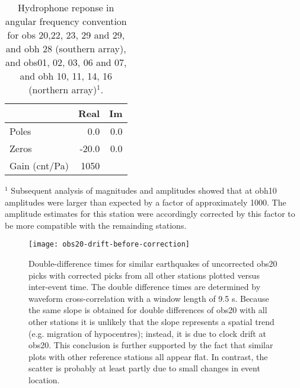 \documentclass[reviewcopy]{elsarticle}
\renewcommand{\includegraphics}[2][]{\fbox{#2}}
\begin{document}
\begin{table}
\caption{Hydrophone reponse in angular frequency convention for obs
  20,22, 23, 29 and 29, and obh 28 (southern array), and obs01, 02,
  03, 06 and 07, and obh 10, 11, 14, 16 (northern array)$^1$. }
\label{tbl:hyd-response}
\renewcommand{\baselinestretch}{1.0}
\small
\begin{center}
\begin{tabular}{lrr}
\hline
 & Real  & Im \\
\hline
Poles & 0.0   & 0.0 \\
Zeros & -20.0 & 0.0 \\
Gain (cnt/Pa) & 1050 & \\
\hline
\end{tabular}
\end{center}
\footnotesize
$^1$ Subsequent analysis of magnitudes and amplitudes showed that at obh10 amplitudes
were larger than expected by a factor of approximately 1000.  The
amplitude estimates for this station were accordingly corrected by
this factor to be more compatible with the remainding stations.
\end{table}


\begin{figure}
\centering
\texttt{[image: obs20-drift-before-correction]}
\caption{Double-difference times for similar earthquakes of uncorrected obs20 picks
with corrected picks from all other stations plotted versus inter-event time. The double difference
times are determined by waveform cross-correlation with a window
length of 9.5 s.  Because
the same slope is obtained for double differences
of obs20 with all other stations  it is unlikely that the slope
represents a spatial trend (e.g. migration of hypocentres); instead,  it is due to clock
drift at obs20.  This conclusion is further
supported by the fact that similar plots with other reference stations
all appear flat. In contrast, the scatter is probably at least partly due to small changes in event location.}
\label{figa:obs20timing}
\end{figure}
\end{document}
